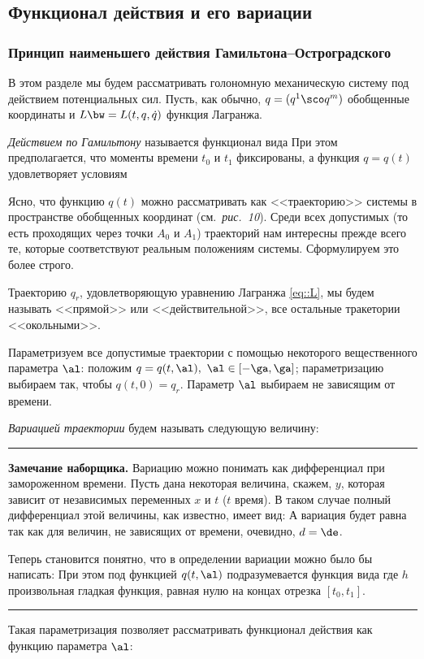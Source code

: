 \documentclass[a4paper,12pt]{article}
\newcommand{\tdf}[1]{\textsl{#1}}
\newcommand{\tpic}[1]{\emph{#1}}
\newenvironment{nbb}{\par\vskip3pt\hrule\vskip3pt\textbf{\footnotesize Замечание наборщика.}\footnotesize }
{\vskip3pt\hrule\par\vskip3pt}
\def\xtrpicturep#1#2{\vadjust{\vbox{%
\vskip.5pc
\centerline{\epsfbox{pictures.#1}}
\vskip2pt
\centerline{\footnotesize\normalfont\textbf{Рис.~#2}}
\vskip.5pc}}}
\begin{document}
\subsection{Функционал действия и его вариации}

\subsubsection{Принцип наименьшего действия Гамильтона--Остроградского}

В этом разделе мы будем рассматривать голономную механическую систему под действием потенциальных
сил. Пусть, как обычно, $q=(q^1\sco q^m)$ обобщенные координаты и $L\bw=L(t,q,\dot{q})$ функция
Лагранжа.
\begin{df}
\tdf{Действием по Гамильтону} называется функционал вида
 При этом предполагается, что
моменты времени $t_0$ и $t_1$ фиксированы, а функция $q=q(t)$ удовлетворяет условиям
\end{df}
Ясно, что функцию $q(t)$ можно рассматривать как <<траекторию>> системы в пространстве обобщенных
координат (см.~\tpic{рис.~10}). \xtrpicturep{10}{10} Среди всех допустимых (то есть проходящих через точки
$A_0$ и $A_1$) траекторий нам интересны прежде всего те, которые соответствуют реальным положениям
системы. Сформулируем это более строго.
\begin{df}
Траекторию $q_r$, удовлетворяющую уравнению Лагранжа \eqref{eq::L}, мы будем называть <<прямой>> или
<<действительной>>, все остальные тракетории <<окольными>>.
\end{df}
Параметризуем все допустимые траектории с помощью некоторого вещественного параметра $\al$: положим
$q=q(t,\al),\ \al\in[-\ga,\ga]$; параметризацию выбираем так, чтобы $q(t,0)=q_r$. Параметр $\al$ выбираем
не зависящим от времени.
\begin{df}
\tdf{Вариацией траектории} будем называть следующую величину:
\end{df}
\begin{nbb}
Вариацию можно понимать как дифференциал при замороженном времени.
Пусть дана некоторая величина, скажем, $y$,
которая зависит от независимых переменных $x$ и $t$ ($t$ время).
В таком случае полный дифференциал этой величины, как известно, имеет вид:
А вариация будет равна
так как для величин, не зависящих от времени, очевидно, $d=\de$.


Теперь становится понятно, что в определении вариации можно было бы написать:
При этом под функцией $q(t,\al)$ подразумевается функция вида
где $h$ произвольная гладкая функция, равная нулю на концах отрезка $[t_0,t_1]$.

\end{nbb}
Такая параметризация позволяет рассматривать функционал действия как функцию параметра $\al$:
\end{document}
